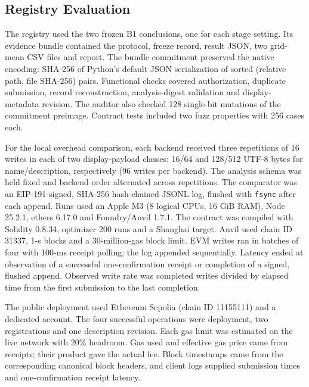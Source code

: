 \subsection{Registry Evaluation}
\label{sec:chain-methods}
The registry used the two frozen B1 conclusions, one for each stage setting. Its evidence bundle contained the protocol, freeze record, result JSON, two grid-mean CSV files and report. The bundle commitment preserved the native encoding: SHA-256 of Python's default JSON serialization of sorted (relative path, file SHA-256) pairs. Functional checks covered authorization, duplicate submission, record reconstruction, analysis-digest validation and display-metadata revision. The auditor also checked 128 single-bit mutations of the commitment preimage. Contract tests included two fuzz properties with 256 cases each.

For the local overhead comparison, each backend received three repetitions of 16 writes in each of two display-payload classes: 16/64 and 128/512 UTF-8 bytes for name/description, respectively (96 writes per backend). The analysis schema was held fixed and backend order alternated across repetitions. The comparator was an EIP-191-signed, SHA-256 hash-chained JSONL log, flushed with \texttt{fsync} after each append. Runs used an Apple M3 (8 logical CPUs, 16 GiB RAM), Node 25.2.1, ethers 6.17.0 and Foundry/Anvil 1.7.1. The contract was compiled with Solidity 0.8.34, optimizer 200 runs and a Shanghai target. Anvil used chain ID 31337, 1-s blocks and a 30-million-gas block limit. EVM writes ran in batches of four with 100-ms receipt polling; the log appended sequentially. Latency ended at observation of a successful one-confirmation receipt or completion of a signed, flushed append. Observed write rate was completed writes divided by elapsed time from the first submission to the last completion.

The public deployment used Ethereum Sepolia (chain ID 11155111) and a dedicated account. The four successful operations were deployment, two registrations and one description revision. Each gas limit was estimated on the live network with 20\% headroom. Gas used and effective gas price came from receipts; their product gave the actual fee. Block timestamps came from the corresponding canonical block headers, and client logs supplied submission times and one-confirmation receipt latency.
